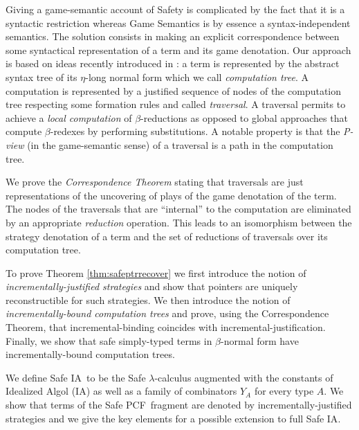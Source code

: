 \documentclass[12pt]{article}
\newcommand\ialgol{\textsf{IA}}
\newcommand\pcf{\textsf{PCF}}
\begin{document}
Giving a game-semantic account of Safety is complicated by the fact
that it is a syntactic restriction whereas Game Semantics is by
essence a syntax-independent semantics. The solution consists in
making an explicit correspondence between some syntactical
representation of a term and its game denotation. Our approach is
based on ideas recently introduced in \cite{OngLics2006}: a term is
represented by the abstract syntax tree of its $\eta$-long normal
form which we call \emph{computation tree}. A computation is
represented by a justified sequence of nodes of the computation tree
respecting some formation rules and called \emph{traversal}. A
traversal permits to achieve a \emph{local computation} of
$\beta$-reductions as opposed to global approaches that compute
$\beta$-redexes by performing substitutions. A notable property is
that the \emph{P-view} (in the game-semantic sense) of a traversal
is a path in the computation tree.

We prove the \emph{Correspondence Theorem} stating that traversals
are just representations of the uncovering of plays of the game
denotation of the term. The nodes of the traversals that are
``internal'' to the computation are eliminated by an appropriate
\emph{reduction} operation. This leads to an isomorphism between the
strategy denotation of a term and the set of reductions of
traversals over its computation tree.

To prove Theorem \ref{thm:safeptrrecover} we first introduce the
notion of \emph{incrementally-justified strategies} and show that
pointers are uniquely reconstructible for such strategies. We then
introduce the notion of \emph{incrementally-bound computation trees}
and prove, using the Correspondence Theorem, that
incremental-binding coincides with incremental-justification.
Finally, we show that safe simply-typed terms in $\beta$-normal form
have incrementally-bound computation trees.

We define Safe \ialgol\ to be the Safe $\lambda$-calculus augmented
with the constants of Idealized Algol (\ialgol) as well as a family
of combinators $Y_A$ for every type $A$. We show that terms of the
Safe \pcf\ fragment are denoted by incrementally-justified
strategies and we give the key elements for a possible extension to
full Safe \ialgol.



\end{document}

